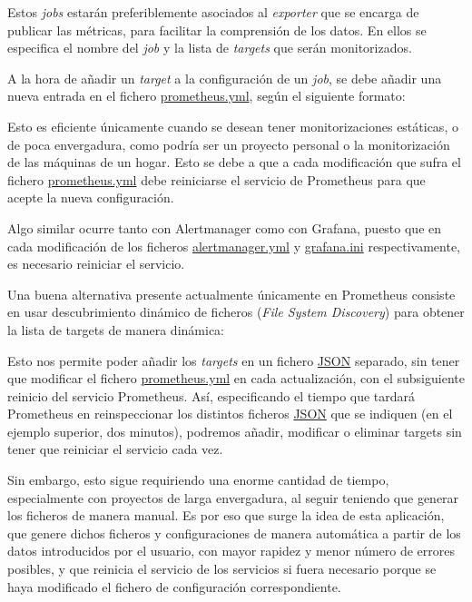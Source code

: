 Estos \textit{jobs} estarán preferiblemente asociados al \textit{exporter} que se encarga de publicar las métricas, para facilitar la comprensión de los datos. En ellos se especifica el nombre del \textit{job} y la lista de \textit{targets} que serán monitorizados.

A la hora de añadir un \textit{target} a la configuración de un \textit{job}, se debe añadir una nueva entrada en el fichero \url{prometheus.yml}, según el siguiente formato:



Esto es eficiente únicamente cuando se desean tener monitorizaciones estáticas, o de poca envergadura, como podría ser un proyecto personal o la monitorización de las máquinas de un hogar. Esto se debe a que a cada modificación que sufra el fichero \url{prometheus.yml} debe reiniciarse el servicio de Prometheus para que acepte la nueva configuración.

Algo similar ocurre tanto con Alertmanager como con Grafana, puesto que en cada modificación de los ficheros \url{alertmanager.yml} y \url{grafana.ini} respectivamente, es necesario reiniciar el servicio.

Una buena alternativa presente actualmente únicamente en Prometheus consiste en usar descubrimiento dinámico de ficheros (\textit{File System Discovery}) para obtener la lista de targets de manera dinámica:



Esto nos permite poder añadir los \textit{targets} en un fichero \url{JSON} separado, sin tener que modificar el fichero \url{prometheus.yml} en cada actualización, con el subsiguiente reinicio del servicio Prometheus. Así, especificando el tiempo que tardará Prometheus en reinspeccionar los distintos ficheros \url{JSON} que se indiquen (en el ejemplo superior, dos minutos), podremos añadir, modificar o eliminar targets sin tener que reiniciar el servicio cada vez.

Sin embargo, esto sigue requiriendo una enorme cantidad de tiempo, especialmente con proyectos de larga envergadura, al seguir teniendo que generar los ficheros de manera manual. Es por eso que surge la idea de esta aplicación, que genere dichos ficheros y configuraciones de manera automática a partir de los datos introducidos por el usuario, con mayor rapidez y menor número de errores posibles, y que reinicia el servicio de los servicios si fuera necesario porque se haya modificado el fichero de configuración correspondiente.

